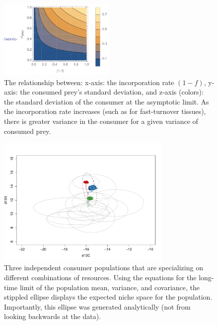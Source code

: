\documentclass[11pt]{article}
\begin{document}
\begin{figure}[h!]
   \centering
   \includegraphics[width=0.5\textwidth]{fig_fvsSigma.pdf}
      \caption{
      The relationship between: x-axis: the incorporation rate $(1-f)$, y-axis: the consumed prey's standard deviation, and z-axis (colors): the standard deviation of the consumer at the asymptotic limit.
      As the incorporation rate increases (such as for fast-turnover tissues), there is greater variance in the consumer for a given variance of consumed prey.
      }
      \label{fig_time}
\end{figure}


\begin{figure}[h!]
   \centering
   \includegraphics[width=0.75\textwidth]{fig_pop_isospace.pdf}
      \caption{
	Three independent consumer populations that are specializing on different combinations of resources.
	Using the equations for the long-time limit of the population mean, variance, and covariance, the stippled ellipse displays the expected niche space for the population. Importantly, this ellipse was generated analytically (not from looking backwards at the data).
	}	
      \label{fig_time}
\end{figure}
\end{document}
